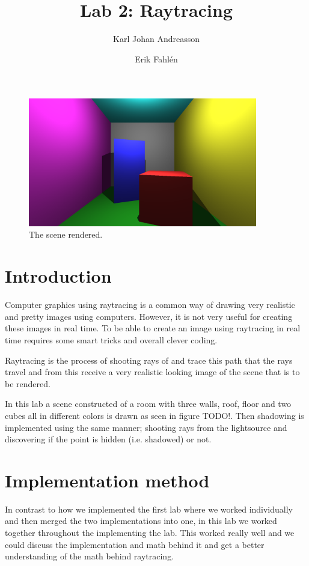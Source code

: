 \documentclass[a4paper]{article}
\begin{document}
\title{Lab 2: Raytracing}

\author{Karl Johan Andreasson \and Erik Fahlén}

\maketitle

\begin{figure}
    \centering
    \includegraphics[width=10cm]{main720.png}
    \caption{The scene rendered.}
    \label{fig:main}
\end{figure}

\section{Introduction}
Computer graphics using raytracing is a common way of drawing very realistic and
pretty images using computers. However, it is not very useful for creating these
images in real time. To be able to create an image using raytracing in real time
requires some smart tricks and overall clever coding.

Raytracing is the process of shooting rays of and trace this path that the rays
travel and from this receive a very realistic looking image of the scene that is
to be rendered.

In this lab a scene constructed of a room with three walls, roof, floor and two
cubes all in different colors is drawn as seen in figure TODO!. Then shadowing
is implemented using the same manner; shooting rays from the lightsource and
discovering if the point is hidden (i.e. shadowed) or not.


\section{Implementation method}
In contrast to how we implemented the first lab where we worked individually and
then merged the two implementations into one, in this lab we worked together
throughout the implementing the lab. This worked really well and we could
discuss the implementation and math behind it and get a better understanding of
the math behind raytracing.
\end{document}
